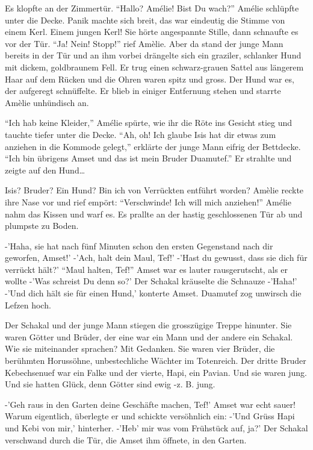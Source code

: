 \documentclass[11pt,titlepage,a5paper]{book}
\begin{document}
Es klopfte an der Zimmertür.
"`Hallo? Amélie! Bist Du wach?"' Amélie schlüpfte unter die Decke. Panik machte sich breit, das war eindeutig die Stimme von einem Kerl. Einem jungen Kerl! Sie hörte angespannte Stille, dann schnaufte es vor der Tür. "`Ja! Nein! Stopp!"' rief Amèlie. Aber da stand der junge Mann bereits in der Tür und an ihm vorbei drängelte sich ein graziler, schlanker Hund mit dickem, goldbraunem Fell. Er trug einen schwarz-grauen Sattel aus längerem Haar auf dem Rücken und die Ohren waren spitz und gross. Der Hund war es, der aufgeregt schnüffelte. Er blieb in einiger Entfernung stehen und starrte Amèlie unhündisch an.

"`Ich hab keine Kleider,"' Amélie spürte, wie ihr die Röte ins Gesicht stieg und tauchte tiefer unter die Decke. "`Ah, oh! Ich glaube Isis hat dir etwas zum anziehen in die Kommode gelegt,"' erklärte der junge Mann eifrig der Bettdecke. "`Ich bin übrigens Amset und das ist mein Bruder Duamutef."' Er strahlte und zeigte auf den Hund\dots

Isis? Bruder? Ein Hund? Bin ich von Verrückten entführt worden? Amèlie reckte ihre Nase vor und rief empört: "`Verschwinde! Ich will mich anziehen!"' Amélie nahm das Kissen und warf es. Es prallte an der hastig geschlossenen Tür ab und plumpste zu Boden.

-'Haha, sie hat nach fünf Minuten schon den ersten Gegenstand nach dir geworfen, Amset!' -'Ach, halt dein Maul, Tef!' -'Hast du gewusst, dass sie dich für verrückt hält?' "`Maul halten, Tef!"' Amset war es lauter rausgerutscht, als er wollte -'Was schreist Du denn so?' Der Schakal kräuselte die Schnauze -'Haha!' -'Und dich hält sie für einen Hund,' konterte Amset. Duamutef zog unwirsch die Lefzen hoch.

Der Schakal und der junge Mann stiegen die grosszügige Treppe hinunter. Sie waren Götter und Brüder, der eine war ein Mann und der andere ein Schakal. Wie sie miteinander sprachen? Mit Gedanken. Sie waren vier Brüder, die berühmten Horussöhne, unbestechliche Wächter im Totenreich. Der dritte Bruder Kebechsenuef war ein Falke und der vierte, Hapi, ein Pavian. Und sie waren jung. Und sie hatten Glück, denn Götter sind ewig -z. B. jung.

-'Geh raus in den Garten deine Geschäfte machen, Tef!' Amset war echt sauer! Warum eigentlich, überlegte er und schickte versöhnlich ein: -'Und Grüss Hapi und Kebi von mir,' hinterher. -'Heb' mir was vom Frühstück auf, ja?' Der Schakal verschwand durch die Tür, die Amset ihm öffnete, in den Garten.
\end{document}
